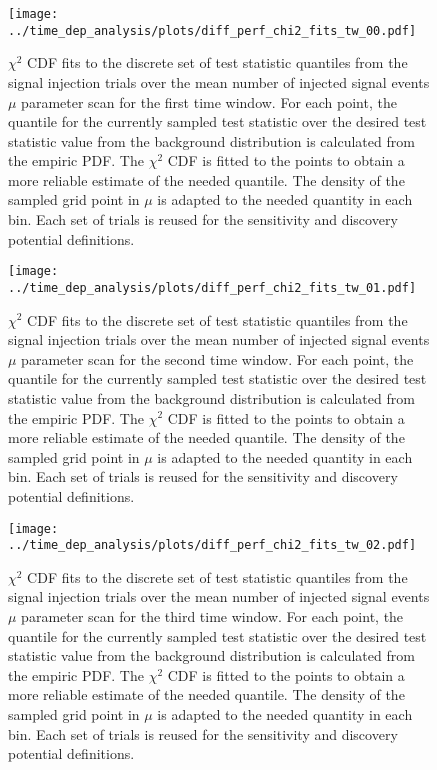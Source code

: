 \begin{figure}[H]
  \centering
  \texttt{[image: ../time\_dep\_analysis/plots/diff\_perf\_chi2\_fits\_tw\_00.pdf]}
  \caption[$\chi^2$ CDF fits for the 1st time window differential performance]{
     $\chi^2$ CDF fits to the discrete set of test statistic quantiles from the signal injection trials over the mean number of injected signal events $\mu$ parameter scan for the first time window.
     For each point, the quantile for the currently sampled test statistic over the desired test statistic value from the background distribution is calculated from the empiric PDF.
     The $\chi^2$ CDF is fitted to the points to obtain a more reliable estimate of the needed quantile.
     The density of the sampled grid point in $\mu$ is adapted to the needed quantity in each bin.
     Each set of trials is reused for the sensitivity and discovery potential definitions.
  }
  \label{fig:diff_perf_chi2_fits_tw_00}
\end{figure}
\begin{figure}[H]
  \centering
  \texttt{[image: ../time\_dep\_analysis/plots/diff\_perf\_chi2\_fits\_tw\_01.pdf]}
  \caption[$\chi^2$ CDF fits for the 2nd time window differential performance]{
     $\chi^2$ CDF fits to the discrete set of test statistic quantiles from the signal injection trials over the mean number of injected signal events $\mu$ parameter scan for the second time window.
     For each point, the quantile for the currently sampled test statistic over the desired test statistic value from the background distribution is calculated from the empiric PDF.
     The $\chi^2$ CDF is fitted to the points to obtain a more reliable estimate of the needed quantile.
     The density of the sampled grid point in $\mu$ is adapted to the needed quantity in each bin.
     Each set of trials is reused for the sensitivity and discovery potential definitions.
  }
  \label{fig:diff_perf_chi2_fits_tw_01}
\end{figure}
\begin{figure}[H]
  \centering
  \texttt{[image: ../time\_dep\_analysis/plots/diff\_perf\_chi2\_fits\_tw\_02.pdf]}
  \caption[$\chi^2$ CDF fits for the 3rd time window differential performance]{
     $\chi^2$ CDF fits to the discrete set of test statistic quantiles from the signal injection trials over the mean number of injected signal events $\mu$ parameter scan for the third time window.
     For each point, the quantile for the currently sampled test statistic over the desired test statistic value from the background distribution is calculated from the empiric PDF.
     The $\chi^2$ CDF is fitted to the points to obtain a more reliable estimate of the needed quantile.
     The density of the sampled grid point in $\mu$ is adapted to the needed quantity in each bin.
     Each set of trials is reused for the sensitivity and discovery potential definitions.
  }
  \label{fig:diff_perf_chi2_fits_tw_02}
\end{figure}
